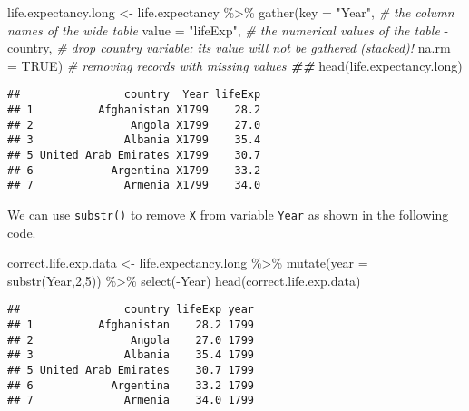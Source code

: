 \documentclass[
]{article}
\newenvironment{Shaded}{\begin{snugshade}}{\end{snugshade}}
\newcommand{\AttributeTok}[1]{\textcolor[rgb]{0.77,0.63,0.00}{#1}}
\newcommand{\CommentTok}[1]{\textcolor[rgb]{0.56,0.35,0.01}{\textit{#1}}}
\newcommand{\ConstantTok}[1]{\textcolor[rgb]{0.00,0.00,0.00}{#1}}
\newcommand{\DecValTok}[1]{\textcolor[rgb]{0.00,0.00,0.81}{#1}}
\newcommand{\DocumentationTok}[1]{\textcolor[rgb]{0.56,0.35,0.01}{\textbf{\textit{#1}}}}
\newcommand{\FunctionTok}[1]{\textcolor[rgb]{0.00,0.00,0.00}{#1}}
\newcommand{\NormalTok}[1]{#1}
\newcommand{\OtherTok}[1]{\textcolor[rgb]{0.56,0.35,0.01}{#1}}
\newcommand{\SpecialCharTok}[1]{\textcolor[rgb]{0.00,0.00,0.00}{#1}}
\newcommand{\StringTok}[1]{\textcolor[rgb]{0.31,0.60,0.02}{#1}}
\begin{document}
\begin{Shaded}
\begin{Highlighting}[]
\NormalTok{life.expectancy.long }\OtherTok{\textless{}{-}}\NormalTok{ life.expectancy }\SpecialCharTok{\%\textgreater{}\%}
  \FunctionTok{gather}\NormalTok{(}\AttributeTok{key =} \StringTok{"Year"}\NormalTok{,       }\CommentTok{\# the column names of the wide table}
         \AttributeTok{value =} \StringTok{"lifeExp"}\NormalTok{,  }\CommentTok{\# the numerical values of the table}
         \SpecialCharTok{{-}}\NormalTok{ country,          }\CommentTok{\# drop country variable: its value will not be gathered (stacked)!}
         \AttributeTok{na.rm =} \ConstantTok{TRUE}\NormalTok{)       }\CommentTok{\# removing records with missing values}
\DocumentationTok{\#\#}
\FunctionTok{head}\NormalTok{(life.expectancy.long)}
\end{Highlighting}
\end{Shaded}

\begin{verbatim}
##                country  Year lifeExp
## 1          Afghanistan X1799    28.2
## 2               Angola X1799    27.0
## 3              Albania X1799    35.4
## 5 United Arab Emirates X1799    30.7
## 6            Argentina X1799    33.2
## 7              Armenia X1799    34.0
\end{verbatim}

We can use \texttt{substr()} to remove \texttt{X} from variable
\texttt{Year} as shown in the following code.

\begin{Shaded}
\begin{Highlighting}[]
\NormalTok{correct.life.exp.data }\OtherTok{\textless{}{-}}\NormalTok{ life.expectancy.long }\SpecialCharTok{\%\textgreater{}\%}
                      \FunctionTok{mutate}\NormalTok{(}\AttributeTok{year =} \FunctionTok{substr}\NormalTok{(Year,}\DecValTok{2}\NormalTok{,}\DecValTok{5}\NormalTok{)) }\SpecialCharTok{\%\textgreater{}\%}
                      \FunctionTok{select}\NormalTok{(}\SpecialCharTok{{-}}\NormalTok{Year)}
\FunctionTok{head}\NormalTok{(correct.life.exp.data)}
\end{Highlighting}
\end{Shaded}

\begin{verbatim}
##                country lifeExp year
## 1          Afghanistan    28.2 1799
## 2               Angola    27.0 1799
## 3              Albania    35.4 1799
## 5 United Arab Emirates    30.7 1799
## 6            Argentina    33.2 1799
## 7              Armenia    34.0 1799
\end{verbatim}
\end{document}
